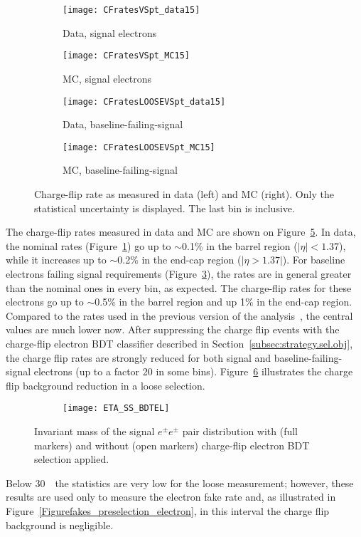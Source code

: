 \begin{figure}[htb!]
\centering
\begin{subfigure}[b]{0.49\textwidth}
	\texttt{[image: CFratesVSpt\_data15]}
	\caption{Data, signal electrons}\label{fig:Chflip_nominalData}
\end{subfigure}
\begin{subfigure}[b]{0.49\textwidth}
	\texttt{[image: CFratesVSpt\_MC15]}
	\caption{MC, signal electrons}\label{fig:Chflip_nominalMC}
\end{subfigure}
\begin{subfigure}[b]{0.49\textwidth}
	\texttt{[image: CFratesLOOSEVSpt\_data15]}
	\caption{Data, baseline-failing-signal}\label{fig:Chflip_looseData}
\end{subfigure}
\begin{subfigure}[b]{0.49\textwidth}
	\texttt{[image: CFratesLOOSEVSpt\_MC15]}
	\caption{MC, baseline-failing-signal}\label{fig:Chflip_looseMC}
\end{subfigure}
\caption{Charge-flip rate as measured in data (left) and MC (right). 
Only the statistical uncertainty is displayed. The last \pt bin is inclusive.}
\label{fig:ChFlip_Rate}
\end{figure}

The charge-flip rates measured in data and MC are shown on Figure~\ref{fig:ChFlip_Rate}. 
 In data, the nominal rates (Figure~\ref{fig:Chflip_nominalData}) go up to $\sim$0.1\% in the barrel region ($|\eta| < 1.37$), 
 while it increases up to $\sim$0.2\% in the end-cap region ($|\eta > 1.37|$). 
 For baseline electrons failing signal requirements (Figure~\ref{fig:Chflip_looseData}), 
 the rates are in general greater than the nominal ones in every bin, as expected. The charge-flip rates for these electrons go up to $\sim$0.5\% in the barrel region and up 1\% in the end-cap region. Compared to the rates used in the previous version of the analysis~\cite{ATLAS-CONF-2016-037}, the central values are much lower now. After suppressing the charge flip events with the charge-flip 
electron BDT classifier described in Section~\ref{subsec:strategy.sel.obj}, 
the charge flip rates are strongly reduced for both signal and baseline-failing-signal electrons (up to a factor 20 in some bins). Figure~\ref{fig:ETA_SS_BDTEL}
illustrates the charge flip background reduction in a loose selection.
\begin{figure}[htb!]
\centering
\begin{subfigure}[t]{0.66\textwidth}\texttt{[image: ETA\_SS\_BDTEL]}\end{subfigure}
\caption{Invariant mass of the signal $e^{\pm} e^{\pm}$ pair distribution with (full markers) and without (open markers) charge-flip electron BDT selection applied.
}
\label{fig:ETA_SS_BDTEL}
\end{figure}
Below 30~\GeV\, the statistics are very low for the loose measurement; however, these results are used only to measure the electron fake rate and, as illustrated in Figure~\ref{Figurefakes_preselection_electron}, in this \pt interval the charge flip background is negligible.

